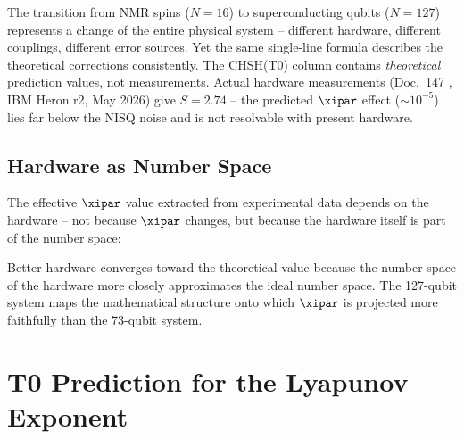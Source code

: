 \begin{keyresult}
	The transition from NMR spins ($N=16$) to superconducting qubits ($N=127$) represents a change of the entire physical system -- different hardware, different couplings, different error sources. Yet the same single-line formula describes the theoretical corrections consistently. The CHSH(T0) column contains \emph{theoretical} prediction values, not measurements. Actual hardware measurements (Doc.~147 \cite{pascher_quantum_computing_2025}, IBM Heron r2, May 2026) give $S = 2.74$ -- the predicted $\xipar$ effect ($\sim 10^{-5}$) lies far below the NISQ noise and is not resolvable with present hardware.
\end{keyresult}

\subsection{Hardware as Number Space}

The effective $\xipar$ value extracted from experimental data depends on the hardware -- not because $\xipar$ changes, but because the hardware itself is part of the number space:

\begin{table}[h]
	\centering
	\caption{$\xipar$ extraction: Hardware convergence toward the theoretical value}
	\label{tab:xi_convergence}
\end{table}

Better hardware converges toward the theoretical value because the number space of the hardware more closely approximates the ideal number space. The 127-qubit system maps the mathematical structure onto which $\xipar$ is projected more faithfully than the 73-qubit system.


\section{T0 Prediction for the Lyapunov Exponent}
\label{sec:lyapunov}

